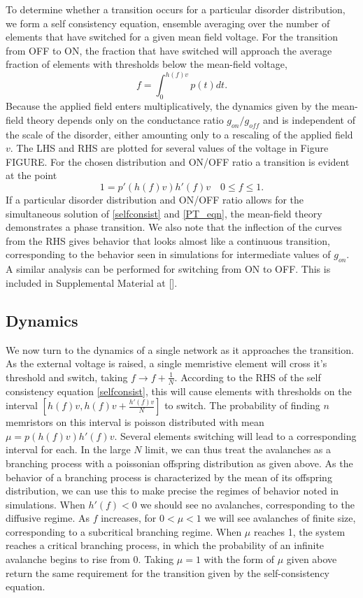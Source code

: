 \documentclass[aps,prl,reprint,groupedaddress]{revtex4-1}
\begin{document}
To determine whether a transition occurs for a particular disorder
distribution, we form a
self consistency equation, ensemble averaging over the number of elements
that have switched for a given mean field voltage. For the transition from
OFF to ON, the fraction that have switched will approach the average fraction
of elements with thresholds below the mean-field voltage,
\begin{equation}\label{selfconsist}
f = \int_0^{h(f) v} p(t) dt.
\end{equation}
Because the applied field enters multiplicatively, the dynamics given by
the mean-field theory depends only on the conductance ratio $g_{on}/g_{off}$
and is independent of the scale of the disorder, either amounting only to
a rescaling of the applied field $v$.  The LHS and
RHS are plotted for several values of the voltage in Figure FIGURE.  For
the chosen distribution and ON/OFF ratio a transition is evident at the
point
\begin{equation}\label{PT_eqn}
1 = p'(h(f)v)h'(f)v \quad 0\le f\le 1.
\end{equation}
If a particular disorder distribution and ON/OFF ratio allows for the
simultaneous solution of \ref{selfconsist} and \ref{PT_eqn}, the mean-field
theory demonstrates a phase transition. We also note that the inflection
of the curves from the RHS gives behavior that looks almost like a continuous
transition, corresponding to the behavior seen in simulations for intermediate
values of $g_{on}$.
A similar analysis can be performed
for switching from ON to OFF. This is included in Supplemental Material
at [].

\subsection{Dynamics}

We now turn to the dynamics of a single network as it approaches the
transition.  As the external voltage is raised, a single memristive element
will cross it's threshold and switch, taking $f\to f + \frac{1}{N}$.
According to the RHS of the self consistency equation \ref{selfconsist},
this will cause
elements with thresholds on the interval $[h(f)v, h(f)v + \frac{h'(f)v}{N}]$
to switch.  The probability of finding $n$ memristors on this interval is
poisson distributed with mean $\mu = p(h(f)v)h'(f)v$. Several elements
switching will lead to a corresponding interval for each. In the large $N$
limit, we can thus treat the avalanches as a branching process with a
poissonian offspring distribution as given above.  As the behavior of a
branching process is characterized by the mean of its offspring distribution,
we can use this to make precise the regimes of behavior noted in simulations.
When $h'(f)<0$ we should see no avalanches, corresponding to the diffusive
regime.  As $f$ increases, for $0<\mu < 1$ we will see avalanches of finite
size, corresponding to a subcritical branching regime.  When $\mu$ reaches 1,
the system reaches a critical branching process, in which the probability of
an infinite avalanche begins to rise from 0. Taking $\mu=1$ with the form of
$\mu$ given above return the same requirement for the transition given by the
self-consistency equation.
\end{document}
